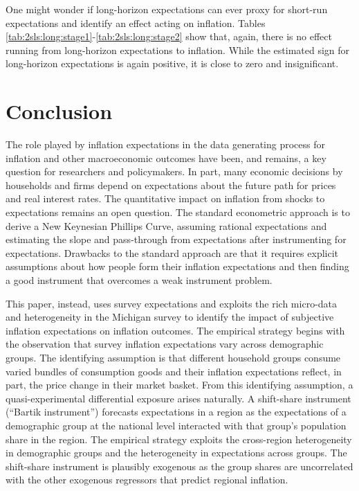 \documentclass[12pt]{article}
\begin{document}



One might wonder if long-horizon expectations can ever proxy for short-run expectations and identify an effect acting on inflation.  Tables \ref{tab:2sls:long:stage1}-\ref{tab:2sls:long:stage2} show that, again, there is no effect running from long-horizon expectations to inflation.  While the estimated sign for long-horizon expectations is again positive, it is close to zero and insignificant.  



 
\section{Conclusion}

The role played by inflation expectations in the data generating process for inflation and other macroeconomic outcomes have been, and remains, a key question for researchers and policymakers. In part, many economic decisions by households and firms depend on expectations about the future path for prices and real interest rates. The quantitative impact on inflation from shocks to expectations remains an open question. The standard econometric approach is to derive a New Keynesian Phillips Curve, assuming rational expectations and estimating the slope and pass-through from expectations after instrumenting for expectations. Drawbacks to the standard approach are that it requires explicit assumptions about how people form their inflation expectations and then finding a good instrument that overcomes a weak instrument problem.

This paper, instead, uses survey expectations and exploits the rich micro-data and heterogeneity in the Michigan survey to identify the impact of subjective inflation expectations on inflation outcomes. The empirical strategy begins with the observation that survey inflation expectations vary across demographic groups. The identifying assumption is that different household groups consume varied bundles of consumption goods and their inflation expectations reflect, in part, the price change in their market basket. From this identifying assumption, a quasi-experimental differential exposure arises naturally. A shift-share instrument (``Bartik instrument'') forecasts expectations in a region as the expectations of a demographic group at the national level interacted with that group's population share in the region. The empirical strategy exploits the cross-region heterogeneity in demographic groups and the heterogeneity in expectations across groups. The shift-share instrument is plausibly exogenous as the group shares are uncorrelated with the other exogenous regressors that predict regional inflation.
\end{document}
